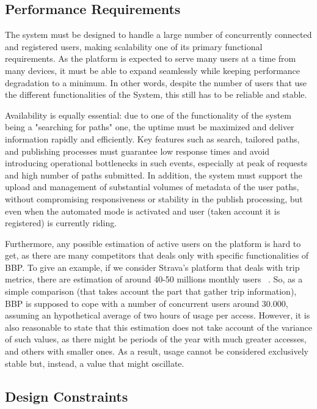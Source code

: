 \subsection{Performance Requirements}
The system must be designed to handle a large number of concurrently connected and registered users, making scalability one of its primary functional requirements. As the platform is expected to serve many users at a time from many devices, it must be able to expand seamlessly while keeping performance degradation to a minimum. In other words, despite the number of users that use the different functionalities of the System, this still has to be reliable and stable.

Availability is equally essential: due to one of the functionality of the system being a "searching for paths" one, the uptime must be maximized and deliver information rapidly and efficiently. Key features such as search, tailored paths, and publishing processes must guarantee low response times and avoid introducing operational bottlenecks in such events, especially at peak of requests and high number of paths submitted. In addition, the system must support the upload and management of substantial volumes of metadata of the user paths, without compromising responsiveness or stability in the publish processing, but even when the automated mode is activated and user (taken account it is registered) is currently riding. 

Furthermore, any possible estimation of active users on the platform is hard to get, as there are many competitors that deals only with specific functionalities of BBP. To give an example, if we consider Strava's platform that deals with trip metrics, there are estimation of around 40-50 millions monthly users ~\cite{StravaYearInSport2025}. So, as a simple comparison (that takes account the part that gather trip information), BBP is supposed to cope with a number of concurrent users around 30.000, assuming an hypothetical average of two hours of usage per access. However, it is also reasonable to state that this estimation does not take account of the variance of such values, as there might be periods of the year with much greater accesses, and others with smaller ones. As a result, usage cannot be considered exclusively stable but, instead, a value that might oscillate. 

\subsection{Design Constraints}
